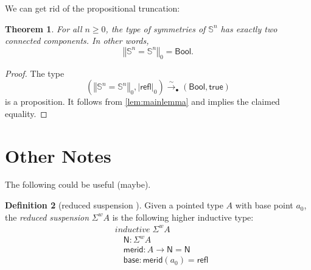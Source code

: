 \documentclass[11pt,a4paper,oneside,reqno]{amsart}
\newtheorem{theorem}{Theorem}
\theoremstyle{definition}
\newtheorem{definition}[theorem]{Definition}
\theoremstyle{remark}
\newcommand{\sph}[1]{{\mathbb S}^{#1}}
\newcommand{\refl}{\mathsf{refl}}
\newcommand{\trunc}[2]{\mathopen{}\left\Vert #2\right\Vert_{#1}\mathclose{}}
\newcommand{\tproj}[3][]{\mathopen{}\left|#3\right|_{#2}^{#1}\mathclose{}}
\newcommand{\North}{\mathsf N}
\newcommand{\merid}{\mathsf{merid}}
\begin{document}
We can get rid of the propositional truncation:
\begin{theorem} \label{thm:symmetries-two-components}
 For all $n \geq 0$, the type of symmetries of $\sph n$ has exactly two connected components.
 In other words,
 \begin{equation}
  \trunc 0 {\sph n = \sph n} = \mathsf{Bool}.
 \end{equation}
\end{theorem}
\begin{proof}
 The type 
 \begin{equation}
  \left(\trunc 0 {\sph n = \sph n}, \tproj {0} \refl\right) \xrightarrow{\sim}_\bullet (\mathsf{Bool},\mathsf{true})
 \end{equation}
 is a proposition.
 It follows from \cref{lem:mainlemma} and implies the claimed equality.
\end{proof}






% 
% 

\appendix

\section{Other Notes}

The following could be useful (maybe).

\begin{definition}[{reduced suspension \cite[Rem 8.6.3]{HoTT}}]
 Given a pointed type $A$ with base point $a_0$, the \emph{reduced suspension} $\Sigma^w A$ is the following higher inductive type:
 \begin{align*}
  & \textit{inductive} \; \Sigma^w A \\
  & \quad \North : \Sigma^w A \\
  & \quad \merid : A \to \North = \North \\
  & \quad \mathsf{base} : \merid(a_0) = \refl
 \end{align*}
\end{definition}
\end{document}
